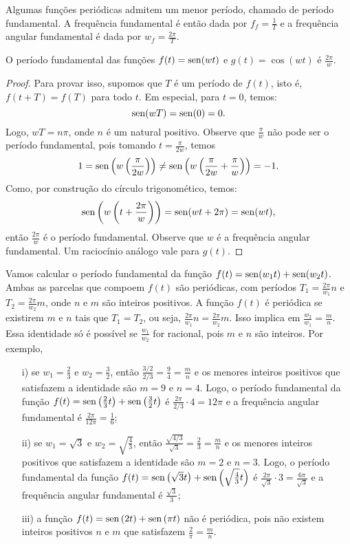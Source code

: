  
\begin{defn} Algumas funções periódicas admitem um menor período, chamado de período fundamental. A frequência fundamental é então dada por $f_f=\frac{1}{T}$ e a frequência angular fundamental é dada por $w_f=\frac{2\pi}{T}$.
 \end{defn}
\begin{prop}O período fundamental das funções $f(t)=\operatorname{sen}(wt)$ e $g(t)=\cos(wt)$ é $\frac{2\pi}{w} $. 
\end{prop}
\begin{proof} Para provar isso, supomos que $T$ é um período de $f(t)$, isto é, $f(t+T)=f(T)$ para todo $t$. Em especial, para $t=0$, temos: 
$$
\operatorname{sen}(wT)=\operatorname{sen}(0)=0.
$$
Logo, $wT=n\pi$, onde $n$ é um natural positivo. Observe que $\frac{\pi}{w}$ não pode ser o período fundamental, pois tomando $t=\frac{\pi}{2w}$, temos
$$1=\operatorname{sen}\left(w\left(\frac{\pi}{2w}\right)\right)\neq \operatorname{sen}\left(w\left(\frac{\pi}{2w}+\frac{\pi}{w}\right)\right)=-1.$$
Como, por construção do círculo trigonomético, temos:
$$
\operatorname{sen}\left(w\left(t+\frac{2\pi}{w}\right)\right)=\operatorname{sen}(wt+2\pi)=\operatorname{sen}(wt),
$$ 
então $\frac{2\pi}{w}$ é o período fundamental. Observe que $w$ é a frequência angular fundamental. Um raciocínio análogo vale para $g(t)$.

\end{proof}
\begin{ex} Vamos calcular o período fundamental da função $f(t)=\operatorname{sen}(w_1t)+\operatorname{sen}(w_2t)$. Ambas as parcelas que compoem $f(t)$ são periódicas, com períodos $T_1=\frac{2\pi}{w_1}n$ e $T_2=\frac{2\pi}{w_2}m$, onde $n$ e $m$ são inteiros positivos. A função $f(t)$ é periódica se existirem $m$ e $n$ tais que $T_1=T_2$, ou seja, $\frac{2\pi}{w_1}n=\frac{2\pi}{w_2}m$. Isso implica em $\frac{w_2}{w_1}=\frac{m}{n}$. Essa identidade só é possível se $\frac{w_1}{w_2}$ for racional, pois $m$ e $n$ são inteiros. Por exemplo, 
\begin{itemize}
 \item[i)] se $w_1=\frac{2}{3}$ e $w_2=\frac{3}{2}$, então $\frac{3/2}{2/3}=\frac{9}{4}=\frac{m}{n}$ e os menores inteiros positivos que satisfazem a identidade são $m=9$ e $n=4$. Logo, o período fundamental da função $f(t)=\operatorname{sen}\left(\frac{2}{3}t\right)+\operatorname{sen}\left(\frac{3}{2}t\right)$ é $\frac{2\pi}{2/3}\cdot 4= 12\pi$ e a frequência angular fundamental é $\frac{2\pi}{12\pi}=\frac{1}{6}$; 
 \item[ii)] se $w_1=\sqrt{3}$ e $w_2=\sqrt{\frac{4}{3}}$, então $\frac{\sqrt{4/3}}{\sqrt{3}}=\frac{2}{3}=\frac{m}{n}$ e os menores inteiros positivos que satisfazem a identidade são $m=2$ e $n=3$. Logo, o período fundamental da função $f(t)=\operatorname{sen}\left(\sqrt{3}t\right)+\operatorname{sen}\left(\sqrt{\frac{4}{3}}t\right)$ é $\frac{2\pi}{\sqrt{3}}\cdot 3= \frac{6\pi}{\sqrt{3}}$ e a frequência angular fundamental é $\frac{\sqrt{3}}{3}$; 
 \item[iii)] a função $f(t)=\operatorname{sen}\left(2t\right)+\operatorname{sen}\left(\pi t\right)$ não é periódica, pois não existem inteiros positivos $n$ e $m$ que satisfazem $\frac{2}{\pi}=\frac{m}{n}$.
 \end{itemize}
\end{ex}

